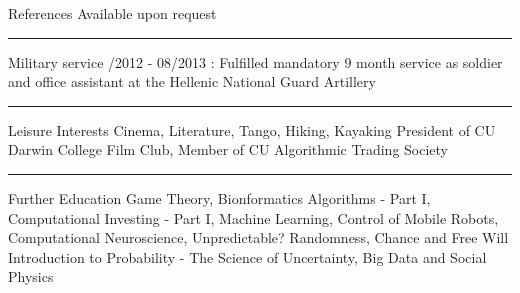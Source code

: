 \documentclass[11pt]{resume}
\begin{document}
\begin{category}{References} 
\citemnobullet Available upon request

\noindent\rule{\textwidth}{0.2pt}
%
%
%    
\end{category}

\begin{category}{Military service} 
/2012 - 08/2013 : Fulfilled mandatory 9 month service as soldier and office assistant at the Hellenic National Guard Artillery  

\noindent\rule{\textwidth}{0.2pt}
\end{category}


\begin{category}{Leisure Interests}
\citemnobullet Cinema, Literature, Tango, Hiking, Kayaking
\citemnobullet President of CU Darwin College Film Club, Member of CU Algorithmic Trading Society %

\noindent\rule{\textwidth}{0.2pt}
\end{category}


\begin{category}{Further Education}
Game Theory,
Bionformatics Algorithms - Part I, Computational Investing - Part I,
Machine Learning, Control of Mobile Robots,
Computational Neuroscience, Unpredictable? Randomness, Chance and Free Will
Introduction to Probability - The Science of Uncertainty,
Big Data and Social Physics
\end{category}
\end{document}
